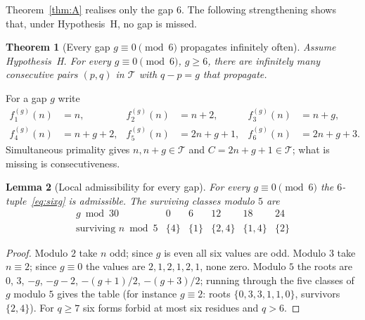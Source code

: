 \documentclass[11pt,a4paper]{article}
\newtheorem{theorem}{Theorem}[section]
\newtheorem{lemma}[theorem]{Lemma}
\theoremstyle{definition}
\theoremstyle{remark}
\newcommand{\T}{\mathcal{T}}
\begin{document}
Theorem~\ref{thm:A} realises only the gap $6$.
The following strengthening shows that, under Hypothesis~H, no gap is missed.

\begin{theorem}[Every gap $g\equiv 0\pmod 6$ propagates infinitely often]\label{thm:everygap}
Assume Hypothesis~H. For every $g\equiv 0\pmod 6$, $g\ge 6$, there are infinitely many consecutive pairs $(p,q)$ in $\T$ with $q-p = g$ that propagate.
\end{theorem}

For a gap $g$ write
\begin{equation}\label{eq:sixg}
\begin{aligned}
f^{(g)}_1(n) &= n, & f^{(g)}_2(n) &= n+2, & f^{(g)}_3(n) &= n+g,\\
f^{(g)}_4(n) &= n+g+2, & f^{(g)}_5(n) &= 2n+g+1, & f^{(g)}_6(n) &= 2n+g+3 .
\end{aligned}
\end{equation}
Simultaneous primality gives $n, n+g\in\T$ and $C = 2n+g+1\in\T$; what is missing is consecutiveness.

\begin{lemma}[Local admissibility for every gap]\label{lem:admg}
For every $g\equiv 0\pmod 6$ the $6$-tuple~\eqref{eq:sixg} is admissible. The surviving classes modulo $5$ are
\[
\begin{array}{c|ccccc}
g \bmod 30 & 0 & 6 & 12 & 18 & 24\\ \hline
\text{surviving } n \bmod 5 & \{4\} & \{1\} & \{2,4\} & \{1,4\} & \{2\}
\end{array}
\]
\end{lemma}

\begin{proof}
Modulo $2$ take $n$ odd; since $g$ is even all six values are odd.
Modulo $3$ take $n\equiv 2$; since $g\equiv 0$ the values are $2,1,2,1,2,1$, none zero.
Modulo $5$ the roots are $0$, $3$, $-g$, $-g-2$, $-(g+1)/2$, $-(g+3)/2$; running through the five classes of $g$ modulo $5$ gives the table (for instance $g\equiv 2$: roots $\{0,3,3,1,1,0\}$, survivors $\{2,4\}$).
For $q\ge 7$ six forms forbid at most six residues and $q>6$.
\end{proof}
\end{document}
